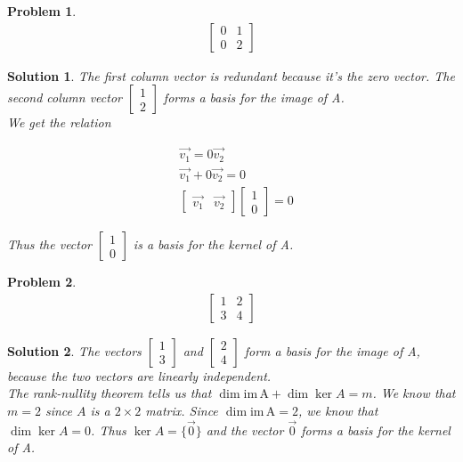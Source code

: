 \documentclass{article}
\newtheorem{problem}{Problem}
\newtheorem*{solution}{Solution}
\newcommand{\im}[1]{\mathrm{im \, #1}}
\begin{document}
\begin{problem}
\begin{align*}
\begin{bmatrix}
0 & 1 \\ 0 & 2
\end{bmatrix}
\end{align*}
\end{problem}

\begin{solution}
The first column vector is redundant because it's the zero vector. The second column vector $\begin{bmatrix} 1 \\ 2 \end{bmatrix}$ forms a basis for the image of A. \\

We get the relation

\begin{align*}
& \vec{v_{1}} = 0\vec{v_{2}} \\
& \vec{v_{1}} + 0\vec{v_{2}} = 0 \\
& \begin{bmatrix} \vec{v_{1}} & \vec{v_{2}} \end{bmatrix} \begin{bmatrix}1 \\ 0 \end{bmatrix} = 0
\end{align*}

Thus the vector $\begin{bmatrix}1 \\ 0 \end{bmatrix}$ is a basis for the kernel of A.

\end{solution}


\begin{problem}
\begin{align*}
\begin{bmatrix}
1 & 2 \\ 3 & 4
\end{bmatrix}
\end{align*}
\end{problem}

\begin{solution}
The vectors $\begin{bmatrix}1 \\ 3 \end{bmatrix}$ and $\begin{bmatrix} 2 \\ 4 \end{bmatrix}$ form a basis for the image of A, because the two vectors are linearly independent. \\

The rank-nullity theorem tells us that $\dim \im A + \dim \ker A = m$. We know that $m = 2$ since $A$ is a $2 \times 2$ matrix. Since $\dim \im A = 2$, we know that $\dim \ker A = 0$. Thus $\ker A = \{ \vec{0} \}$ and the vector $\vec{0}$ forms a basis for the kernel of A.
\end{solution}
\end{document}
